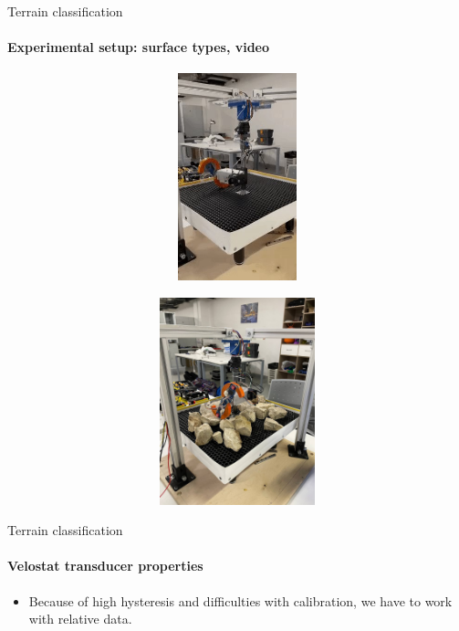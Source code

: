 \documentclass[aspectratio=169]{beamer}
\begin{document}
\begin{frame}[t]{Terrain classification}
    \framesubtitle{Experimental setup: surface types, video}
    \vspace{-15pt}
    \begin{figure}[H]
        \begin{subfigure}{0.49\textwidth}
            \href{https://gifyu.com/image/SxatY}
            {\centering\includegraphics[height=6cm,width=1\textwidth,keepaspectratio]{s_shape_leg/flat.jpg}}
        \end{subfigure}
        \hfill
        \begin{subfigure}{0.49\textwidth}
            \href{https://gifyu.com/image/Sxatt}
            {\centering\includegraphics[height=6cm,width=1\textwidth,keepaspectratio]{s_shape_leg/view.jpg}}
        \end{subfigure}
    \end{figure}
\end{frame}

\begin{frame}[t]{Terrain classification}
    \framesubtitle{Velostat transducer properties}
    \Large
    \begin{itemize}
        \item Because of high hysteresis and difficulties with calibration, we have to work with relative data.
    \end{itemize}

\end{frame}
\end{document}
